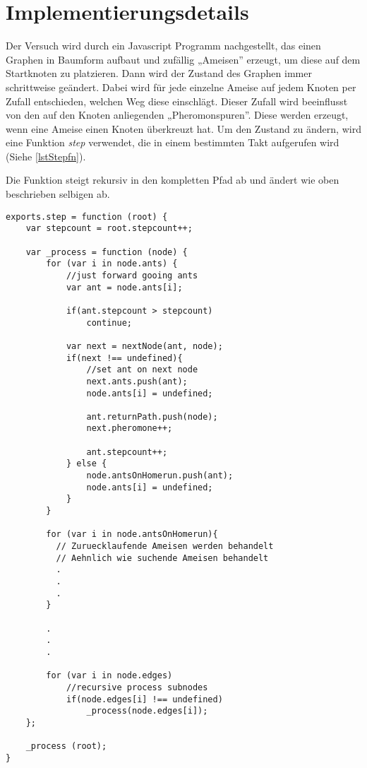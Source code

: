 
\section{Implementierungsdetails}

Der Versuch wird durch ein Javascript Programm nachgestellt, das einen
Graphen in Baumform aufbaut und zufällig „Ameisen” erzeugt, um
diese auf dem Startknoten zu platzieren. Dann wird der Zustand des Graphen
immer schrittweise geändert. Dabei wird für jede einzelne Ameise auf
jedem Knoten per Zufall entschieden, welchen Weg diese
einschlägt. Dieser Zufall wird beeinflusst von den auf den Knoten
anliegenden „Pheromonspuren”. Diese werden erzeugt, wenn eine Ameise
einen Knoten überkreuzt hat. Um den Zustand zu ändern, wird eine
Funktion \emph{step} verwendet, die in einem bestimmten Takt
aufgerufen wird (Siehe \ref{lstStepfn}).

Die Funktion steigt rekursiv in den kompletten Pfad ab und ändert wie
oben beschrieben selbigen ab.

\begin{lstlisting}[captionpos=b, caption=Step Funktion, label=lstStepfn]
exports.step = function (root) {
    var stepcount = root.stepcount++;

    var _process = function (node) {
        for (var i in node.ants) {
            //just forward gooing ants
            var ant = node.ants[i];

            if(ant.stepcount > stepcount)
                continue;

            var next = nextNode(ant, node);
            if(next !== undefined){
                //set ant on next node
                next.ants.push(ant);
                node.ants[i] = undefined;

                ant.returnPath.push(node);
                next.pheromone++;

                ant.stepcount++;
            } else {
                node.antsOnHomerun.push(ant);
                node.ants[i] = undefined;
            }
        }

        for (var i in node.antsOnHomerun){
          // Zuruecklaufende Ameisen werden behandelt
          // Aehnlich wie suchende Ameisen behandelt
          .
          .
          .
        }

        .
        .
        .

        for (var i in node.edges)
            //recursive process subnodes
            if(node.edges[i] !== undefined)
                _process(node.edges[i]);
    };

    _process (root);
}
\end{lstlisting}

